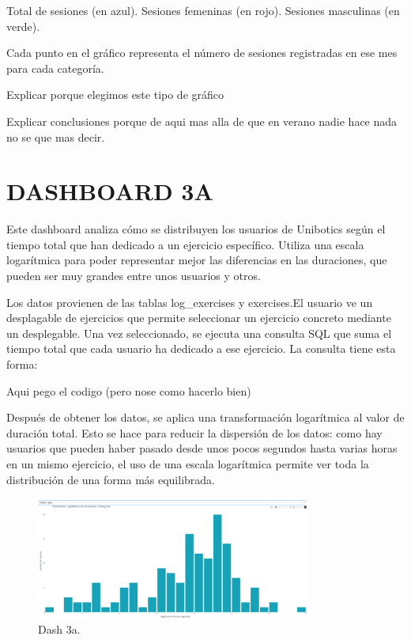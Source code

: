 \documentclass[a4paper, 12pt]{book}
\begin{document}
    Total de sesiones (en azul).
    Sesiones femeninas (en rojo).
    Sesiones masculinas (en verde).

Cada punto en el gráfico representa el número de sesiones registradas en ese mes para cada categoría.

Explicar porque elegimos este tipo de gráfico

Explicar conclusiones porque de aqui mas alla de que en verano nadie hace nada no se que mas decir.


\section{DASHBOARD 3A}

Este dashboard analiza cómo se distribuyen los usuarios de Unibotics según el tiempo total que han dedicado a un ejercicio específico. Utiliza una escala logarítmica para poder representar mejor las diferencias en las duraciones, que pueden ser muy grandes entre unos usuarios y otros.

Los datos provienen de las tablas log\_exercises y exercises.El usuario ve un desplagable de ejercicios que permite seleccionar un ejercicio concreto mediante un desplegable. Una vez seleccionado, se ejecuta una consulta SQL que suma el tiempo total que cada usuario ha dedicado a ese ejercicio.
La consulta tiene esta forma:

Aqui pego el codigo (pero nose como hacerlo bien)

Después de obtener los datos, se aplica una transformación logarítmica al valor de duración total. Esto se hace para reducir la dispersión de los datos: como hay usuarios que pueden haber pasado desde unos pocos segundos hasta varias horas en un mismo ejercicio, el uso de una escala logarítmica permite ver toda la distribución de una forma más equilibrada.

\begin{figure}
  \centering
  \includegraphics[width=9cm, keepaspectratio]{img/3a.png}
  \caption{Dash 3a.}\label{fig:3a}
\end{figure}
\end{document}
